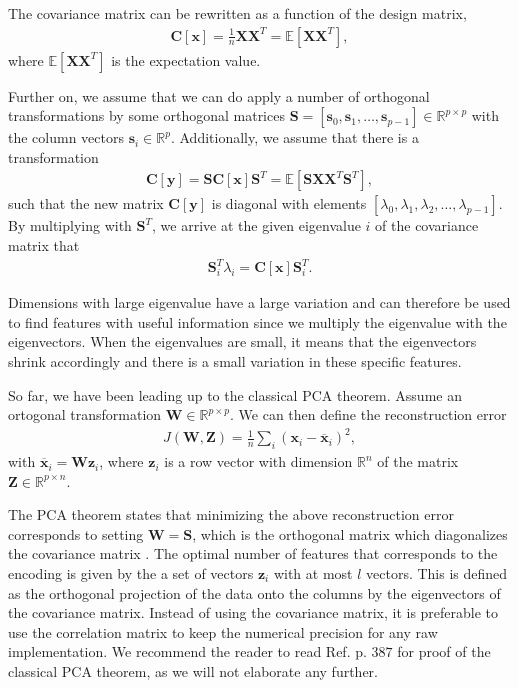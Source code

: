 The covariance matrix can be rewritten as a function of the design matrix,
\begin{align}
  \boldsymbol{C}[\boldsymbol{x}] = \frac{1}{n}\boldsymbol{X}\boldsymbol{X}^T= \mathbb{E}[\boldsymbol{X}\boldsymbol{X}^T],
\end{align}
where $\mathbb{E}[\boldsymbol{X}\boldsymbol{X}^T]$ is the expectation value.

Further on, we assume that we can do apply a number of orthogonal transformations by some orthogonal matrices $\boldsymbol{S}=[\boldsymbol{s}_0,\boldsymbol{s}_1,\dots,\boldsymbol{s}_{p-1}]\in {\mathbb{R}}^{p\times p}$ with the column vectors $\boldsymbol{s}_i \in {\mathbb{R}}^{p}$. Additionally, we assume that there is a transformation
\begin{align}
  \boldsymbol{C}[\boldsymbol{y}] =\boldsymbol{S}\boldsymbol{C}[\boldsymbol{x}]\boldsymbol{S}^T = \mathbb{E}[\boldsymbol{S}\boldsymbol{X}\boldsymbol{X}^T\boldsymbol{S}^T],
\end{align}
such that the new matrix $\boldsymbol{C}[\boldsymbol{y}]$ is diagonal with elements $[\lambda_0,\lambda_1,\lambda_2,\dots,\lambda_{p-1}]$. By multiplying with $\boldsymbol{S}^T$, we arrive at the given eigenvalue $i$ of the covariance matrix that
\begin{align}
  \boldsymbol{S}^T_i\lambda_i = \boldsymbol{C}[\boldsymbol{x}]\boldsymbol{S}^T_i.
\end{align}

Dimensions with large eigenvalue have a large variation and can therefore be used to find features with useful information since we multiply the eigenvalue with the eigenvectors. When the eigenvalues are small, it means that the eigenvectors shrink accordingly and there is a small variation in these specific features.

So far, we have been leading up to the classical PCA theorem. Assume an ortogonal transformation $\boldsymbol{W}\in {\mathbb{R}}^{p\times p}$. We can then define the reconstruction error
\begin{align}
  J(\boldsymbol{W},\boldsymbol{Z}) = \frac{1}{n}\sum_i (\boldsymbol{x}_i - \overline{\boldsymbol{x}}_i)^2,
\end{align}
with $\overline{\boldsymbol{x}}_i = \boldsymbol{W}\boldsymbol{z}_i$, where $\boldsymbol{z}_i$ is a row vector with dimension ${\mathbb{R}}^{n}$ of the matrix
$\boldsymbol{Z}\in{\mathbb{R}}^{p\times n}$.

The PCA theorem states that minimizing the above reconstruction error corresponds to setting $\boldsymbol{W}=\boldsymbol{S}$, which is the orthogonal matrix which diagonalizes the covariance matrix \cite{Murphy2012}. The optimal number of features that corresponds to the encoding is given by the a set of vectors $\boldsymbol{z}_i$ with at most $l$ vectors. This is defined as the orthogonal projection of the data onto the columns by the eigenvectors of the covariance matrix. Instead of using the covariance matrix, it is preferable to use the correlation matrix to keep the numerical precision for any raw implementation. We recommend the reader to read Ref. \cite{Murphy2012} p. $387$ for proof of the classical PCA theorem, as we will not elaborate any further. 

